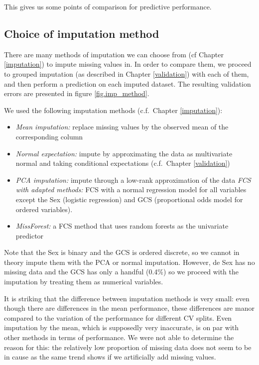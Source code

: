 This gives us some points of comparison for predictive performance.

		\subsection{Choice of imputation method}
There are many methods of imputation we can choose from (cf Chapter \ref{imputation}) to impute missing values in. In order to compare them, we proceed to grouped imputation (as described in Chapter \ref{validation}) with each of them, and then perform a prediction on each imputed dataset. The resulting validation errors are presented in figure \ref{fig.imp_method}.

We used the following imputation methods (c.f.\ Chapter \ref{imputation}):
\begin{itemize}
\item \emph{Mean imputation:} replace missing values by the observed mean of the corresponding column
\item \emph{Normal expectation:} impute by approximating the data as multivariate normal and taking conditional expectations (c.f.\ Chapter \ref{validation})
\item \emph{PCA imputation:} impute through a low-rank approximation of the data
\emph{FCS with adapted methods:} FCS with a normal regression model for all variables except the Sex (logistic regression) and GCS (proportional odds model for ordered variables).
\item \emph{MissForest:} a FCS method that uses random forests as the univariate predictor
\end{itemize}

Note that the Sex is binary and the GCS is ordered discrete, so we cannot in theory impute them with the PCA or normal imputation. However, de Sex has no missing data and the GCS has only a handful (0.4\%) so we proceed with the imputation by treating them as numerical variables.



It is striking that the difference between imputation methods is very small: even though there are differences in the mean performance, these differences are manor compared to the variation of the performance for different CV splits. Even imputation by the mean, which is supposedly very inaccurate, is on par with other methods in terms of performance. We were not able to determine the reason for this: the relatively low proportion of missing data does not seem to be in cause as the same trend shows if we artificially add missing values.

